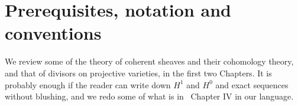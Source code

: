 \section{Prerequisites, notation and conventions}

We review some of the theory of coherent sheaves and their cohomology theory, and that of divisors on projective 
varieties, in the first two Chapters. It is probably enough if the reader can write down $H^1$ and $H^0$ and exact sequences without blushing, and we redo some of what is in~\cite[Chapter IV]{Hartshorne1977}  Chapter IV in our language. 







%
%
%




